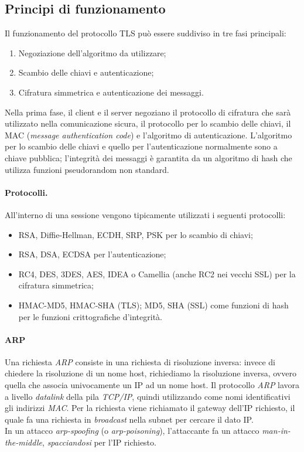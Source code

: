 \subsection{Principi di funzionamento}
Il funzionamento del protocollo TLS può essere suddiviso in tre fasi principali:
\begin{enumerate}
	\item Negoziazione dell'algoritmo da utilizzare;
	\item Scambio delle chiavi e autenticazione;
	\item Cifratura simmetrica e autenticazione dei messaggi.
\end{enumerate}
Nella prima fase, il client e il server negoziano il protocollo di cifratura che sarà utilizzato nella comunicazione sicura, il protocollo per lo scambio delle chiavi, il MAC (\textit{message authentication code}) e l'algoritmo di autenticazione. L'algoritmo per lo scambio delle chiavi e quello per l'autenticazione normalmente sono a chiave pubblica; l'integrità dei messaggi è garantita da un algoritmo di hash che utilizza funzioni pseudorandom non standard.

\paragraph{Protocolli.} All'interno di una sessione vengono tipicamente utilizzati i seguenti protocolli:
\begin{itemize}
	\item RSA, Diffie-Hellman, ECDH, SRP, PSK per lo scambio di chiavi;
	\item RSA, DSA, ECDSA per l'autenticazione;
	\item RC4, DES, 3DES, AES, IDEA o Camellia (anche RC2 nei vecchi SSL) per la cifratura simmetrica;
	\item HMAC-MD5, HMAC-SHA (TLS); MD5, SHA (SSL) come funzioni di hash per le funzioni crittografiche d'integrità. 
\end{itemize}

\paragraph{ARP}
Una richiesta \textit{ARP} consiste in una richiesta di risoluzione inversa: invece di chiedere la risoluzione di un nome host, richiediamo la risoluzione inversa, ovvero quella che associa univocamente un IP ad un nome host. Il protocollo \textit{ARP} lavora a livello \textit{datalink} della pila \textit{TCP/IP}, quindi utilizzando come nomi identificativi gli indirizzi \textit{MAC}. Per la richiesta viene richiamato il gateway dell'IP richiesto, il quale fa una richiesta in \textit{broadcast} nella subnet per cercare il dato IP. \\
In un attacco \textit{arp-spoofing} (o \textit{arp-poisoning}), l'attaccante fa un attacco \textit{man-in-the-middle}, \textit{spacciandosi} per l'IP richiesto.
